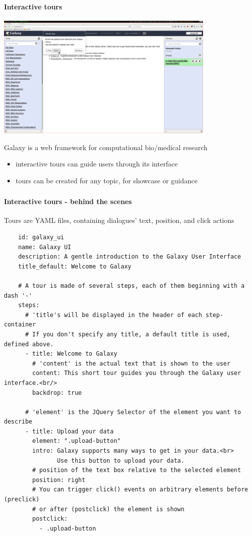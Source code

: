 \documentclass[xcolor=dvipsnames]{beamer}
\begin{document}
\begin{frame}
  \frametitle{\two}
  \framesubtitle{Interactive tours}
  \vspace{-0.2cm}
  \begin{center}
    \includegraphics[width=0.80\textwidth]{images/screenshot_usegalaxy_tours}
  \end{center}
  Galaxy is a web framework for computational bio/medical research
  \begin{itemize}
    \item interactive tours can guide users through its interface
    \item tours can be created for any topic, for showcase or guidance
  \end{itemize}
\end{frame}

\begin{frame}[fragile]
  \frametitle{\two}
  \framesubtitle{Interactive tours - behind the scenes}
  Tours are YAML files, containing dialogues' text, position, and click actions
  \begin{lstlisting}
    id: galaxy_ui
    name: Galaxy UI
    description: A gentle introduction to the Galaxy User Interface
    title_default: Welcome to Galaxy

    # A tour is made of several steps, each of them beginning with a dash '-'
    steps:
      # 'title's will be displayed in the header of each step-container
      # If you don't specify any title, a default title is used, defined above.
      - title: Welcome to Galaxy
        # 'content' is the actual text that is shown to the user
        content: This short tour guides you through the Galaxy user interface.<br/>
        backdrop: true

      # 'element' is the JQuery Selector of the element you want to describe
      - title: Upload your data
        element: ".upload-button"
        intro: Galaxy supports many ways to get in your data.<br>
               Use this button to upload your data.
        # position of the text box relative to the selected element
        position: right
        # You can trigger click() events on arbitrary elements before (preclick)
        # or after (postclick) the element is shown
        postclick:
          - .upload-button

  \end{lstlisting}
\end{frame}
\end{document}
